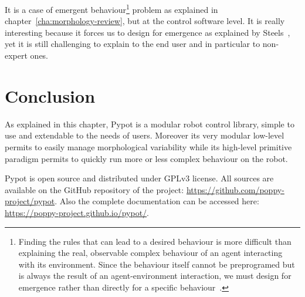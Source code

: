 It is a case of emergent behaviour\footnote{Finding the rules that can lead to a desired behaviour is more difficult than explaining the real, observable complex behaviour of an agent interacting with its environment. Since the behaviour itself cannot be preprogramed but is always the result of an agent-environment interaction, we must design for emergence rather than directly for a specific behaviour~\parencite{Pfeifer06}.} problem as explained in chapter~\ref{cha:morphology-review}, but at the control software level. It is really interesting because it forces us to design  for emergence as explained by Steels~\parencite{Steels1991emergence}, yet it is still challenging to explain to the end user and in particular to non-expert ones.


\section{Conclusion} %

As explained in this chapter, Pypot is a modular robot control library, simple to use and extendable to the needs of users. Moreover its very modular low-level permits to easily manage morphological variability while its high-level primitive paradigm permits to quickly run more or less complex behaviour on the robot.

Pypot is open source and distributed under GPLv3 license. All sources are available on the GitHub repository of the project: \url{https://github.com/poppy-project/pypot}. Also the complete documentation can be accessed here: \url{https://poppy-project.github.io/pypot/}.





% 



